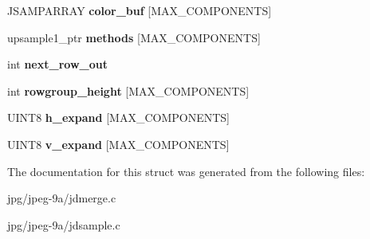 \begin{DoxyCompactItemize}
\item 
\hypertarget{structmy__upsampler_a72da5ad87430b974aeabce55c30eb653}{J\+S\+A\+M\+P\+A\+R\+R\+A\+Y {\bfseries color\+\_\+buf} \mbox{[}M\+A\+X\+\_\+\+C\+O\+M\+P\+O\+N\+E\+N\+T\+S\mbox{]}}\label{structmy__upsampler_a72da5ad87430b974aeabce55c30eb653}

\item 
\hypertarget{structmy__upsampler_a3f1f669c2871ccaee6009ec6f96899d3}{upsample1\+\_\+ptr {\bfseries methods} \mbox{[}M\+A\+X\+\_\+\+C\+O\+M\+P\+O\+N\+E\+N\+T\+S\mbox{]}}\label{structmy__upsampler_a3f1f669c2871ccaee6009ec6f96899d3}

\item 
\hypertarget{structmy__upsampler_a9e77765267bd21be6cb005b748034d76}{int {\bfseries next\+\_\+row\+\_\+out}}\label{structmy__upsampler_a9e77765267bd21be6cb005b748034d76}

\item 
\hypertarget{structmy__upsampler_a05806e1394a2638e4912da137b9d4bcd}{int {\bfseries rowgroup\+\_\+height} \mbox{[}M\+A\+X\+\_\+\+C\+O\+M\+P\+O\+N\+E\+N\+T\+S\mbox{]}}\label{structmy__upsampler_a05806e1394a2638e4912da137b9d4bcd}

\item 
\hypertarget{structmy__upsampler_a4a82028e54b1f7e57b2c1f7d63290f65}{U\+I\+N\+T8 {\bfseries h\+\_\+expand} \mbox{[}M\+A\+X\+\_\+\+C\+O\+M\+P\+O\+N\+E\+N\+T\+S\mbox{]}}\label{structmy__upsampler_a4a82028e54b1f7e57b2c1f7d63290f65}

\item 
\hypertarget{structmy__upsampler_a48df5e8df66ba2f1275f54a617eaf888}{U\+I\+N\+T8 {\bfseries v\+\_\+expand} \mbox{[}M\+A\+X\+\_\+\+C\+O\+M\+P\+O\+N\+E\+N\+T\+S\mbox{]}}\label{structmy__upsampler_a48df5e8df66ba2f1275f54a617eaf888}

\end{DoxyCompactItemize}


The documentation for this struct was generated from the following files\+:\begin{DoxyCompactItemize}
\item 
jpg/jpeg-\/9a/jdmerge.\+c\item 
jpg/jpeg-\/9a/jdsample.\+c\end{DoxyCompactItemize}
